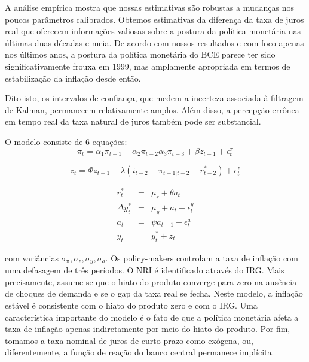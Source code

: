 A análise empírica mostra que nossas estimativas são robustas a mudanças nos poucos parâmetros calibrados. Obtemos estimativas da diferença da taxa de juros real que oferecem informações valiosas sobre a postura da política monetária nas últimas duas décadas e meia. De acordo com nossos resultados e com foco apenas nos últimos anos, a postura da política monetária do BCE parece ter sido significativamente frouxa em 1999, mas amplamente apropriada em termos de estabilização da inflação desde então.

Dito isto, os intervalos de confiança, que medem a incerteza associada à filtragem de Kalman, permanecem relativamente amplos. Além disso, a percepção errônea em tempo real da taxa natural de juros também pode ser substancial.

O modelo consiste de 6 equações:
\begin{equation} \label{Eq.NKPC}
    \pi_t = \alpha_1 \pi_{t-1} + \alpha_2 \pi_{t-2} \alpha_3 \pi_{t-3} + \beta z_{t-1} + \epsilon_t^{\pi}
\end{equation}

\begin{equation} \label{Eq. IS}
    z_t = \Phi z_{t-1} + \lambda(i_{t-2} - \pi_{t-1|t-2} - r_{t-2}^{*}) + \epsilon_t^{z}
\end{equation}

\begin{eqnarray}
    r_{t}^{*} &=& \mu_r + \theta a_t \label{Eq. estado_NRI} \\
    \Delta y_t^{*} &=& \mu_y + a_t + \epsilon_t^{y}   \label{Eq. estado_outputgap} \\
    a_t &=& \psi a_{t-1} + \epsilon_t^{a} \label{Eq. estado_produtividade} \\
    y_t &=& y_t^{*} + z_t     \label{Eq. estado_potencial}
\end{eqnarray}

com variâncias $\sigma_{\pi}, \sigma_z, \sigma_y, \sigma_a $. Os policy-makers controlam a taxa de inflação com uma defasagem de três períodos. O NRI é identificado através do IRG. Mais precisamente, assume-se que o hiato do produto converge para zero na ausência de choques de demanda e se o gap da taxa real se fecha. Neste modelo, a inflação estável é consistente com o hiato do produto zero e com o IRG. Uma característica importante do modelo é o fato de que a política monetária afeta a taxa de inflação apenas indiretamente por meio do hiato do produto. Por fim, tomamos a taxa nominal de juros de curto prazo como exógena, ou, diferentemente, a função de reação do banco central permanece implícita.

